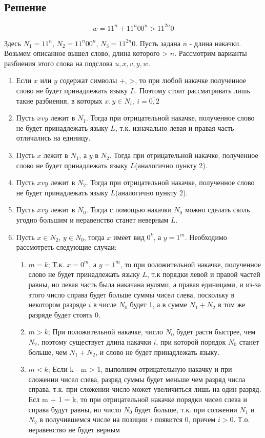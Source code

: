 \documentclass[a4paper, 14pt]{article}
\begin{document}
\subsection{Решение}

$$
w =  11^n + 11^n00^n > 11^{2n}0
$$


Здесь $N_1 = 11^n$, $N_2 = 11^n00^n$, $N_3 = 11^{2n}0$.
Пусть задана $n$ - длина накачки. Возьмем описанное вышел слово, длина которого > $n$.
Рассмотрим варианты разбиения этого слова на подслова $u, x, v ,y, w$.


\begin{enumerate}

	\item{
			Если $x$ или $y$ содержат символы +, >, то при любой накачке полученное слово не будет принадлежать языку $L$. Поэтому стоит рассматривать лишь такие разбиения, в которых $x, y \in N_i, \ i=\overline{0,2}$
		}
    \item{
			Пусть $xvy$ лежит в $N_1$. Тогда при отрицательной накачке, полученное слово не будет принадлежать языку $L$, т.к. изначально левая и правая часть отличались на единицу.
		}
	\item{
			Пусть $x$ лежит в $N_1$, а $y$ в $N_2$. Тогда при отрицательной накачке, полученное слово не будет принадлежать языку $L$(аналогично пункту 2).
		}	
	\item{
			Пусть $xvy$ лежит в $N_2$. Тогда при отрицательной накачке, полученное слово не будет принадлежать языку $L$(аналогично пункту 2).
		}
	\item{
			Пусть $xvy$ лежит в $N_0$. Тогда с помощью накачки $N_0$ можно сделать сколь угодно большим и неравенство станет неверным $L$.
		}

	\item{
			Пусть $x \in N_2$, $y \in N_0$, тогда $x$ имеет вид $0^k$, а $y = 1^m$. Необходимо рассмотреть следующие случаи:
			
    \begin{enumerate}
		\item{ $m = k$; Т.к. $x = 0^m$, а $y = 1^m$, то при положительной накачке, полученное слово не будет принадлежать языку $L$, т.к порядки левой и правой частей равны,
			но левая часть была накачана нулями, а правая единицами, и из-за этого число справа будет больше суммы чисел слева, поскольку в некотором разряде $i$ в числе $N_0$ будет 1, а в сумме $N_1 + N_2$ в том же разряде будет стоять 0. 
			} 
		\item{ $m > k$; При положительной накачке, число $N_0$ будет расти быстрее, чем $N_2$, поэтому существует длина накачки $i$, при которой порядок $N_0$ станет больше, чем $N_1 + N_2$, и слово не будет принадлежать языку.} 
		\item{ $m < k$; Если k - m > 1, выполним отрицательную накачку и при сложении чисел слева, разряд суммы будет меньше чем разряд числа справа, т.к. при сложении число может увеличиться лишь на один разряд. Есл m + 1 = k, то при отрицательной накачке порядки чисел слева и справа будут равны, но число $N_0$ будет больше, т.к. при солжении $N_1$ и $N_2$ в получившемся числе на позиции $i$ появится 0, причем $i > 0$. Т.о. неравенство не будет верным} 
    \end{enumerate}
		}
\end{enumerate}
\end{document}
